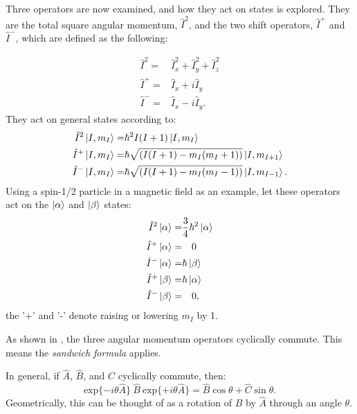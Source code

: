 Three operators are now examined, and how they act on states is explored. They are the total square angular momentum, $\hat{I}^2$,
and the two shift operators, $\hat{I}^+$ and $\hat{I}^-$, which are defined as the following:

\begin{align}
  \hat{I}^2 =& \hat{I}_x^2 + \hat{I}_y^2 + \hat{I}_z^2\\
  \hat{I}^+ =& \hat{I}_x + i\hat{I}_y\\
  \hat{I}^- =& \hat{I}_x - i\hat{I}_y.
\end{align}
They act on general states according to:
\begin{align}
  \hat{I}^2\ket{I,m_I} =& \hbar^2I(I+1)\ket{I, m_I}\\
  \hat{I}^+\ket{I,m_I} =& \hbar\sqrt{(I(I+1)-m_I(m_I+1))}\ket{I,m_{I+1}}\\
  \hat{I}^-\ket{I,m_I} =& \hbar\sqrt{(I(I+1)-m_I(m_I-1))}\ket{I,m_{I-1}}.
\end{align}
Using a spin-1/2 particle in a magnetic field as an example, let these operators act on the $\ket{\alpha}$ and $\ket{\beta}$ states:
\begin{align}
  \hat{I}^2\ket{\alpha} =& \frac{3}{4}\hbar^2\ket{\alpha}\\
  \hat{I}^+\ket{\alpha} =&\quad0\\
  \hat{I}^-\ket{\alpha} =& \hbar\ket{\beta}\\
  \hat{I}^+\ket{\beta} =& \hbar\ket{\alpha}\\
  \hat{I}^-\ket{\beta} =&\quad0,
\end{align}
the '+' and '-' denote raising or lowering $m_I$ by 1.

As shown in , the three angular momentum operators cyclically
commute. This means the \textit{sandwich formula} applies.

In general, if $\hat{A}$, $\hat{B}$, and $\hat{C}$ cyclically commute, then:
\begin{equation}
  \text{exp}\{-i\theta\hat{A}\}\:\hat{B}\:\text{exp}\{+i\theta\hat{A}\} = \hat{B}\cos{\theta} + \hat{C}\sin{\theta}.
\end{equation}
Geometrically, this can be thought of as a rotation of $\hat{B}$ by $\hat{A}$ through
an angle $\theta$.

